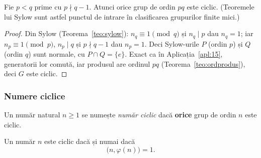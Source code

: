 \begin{propozitie}\label{prop:pqciclic}
Fie $p<q$ prime cu $p\nmid q-1$. Atunci orice grup de ordin $pq$ este ciclic. (Teoremele lui Sylow sunt astfel punctul de intrare în clasificarea grupurilor finite mici.)
\end{propozitie}

\begin{proof}
Din Sylow (Teorema~\ref{teo:sylow}): $n_q\equiv1\pmod q$ și $n_q\mid p$ dau $n_q=1$; iar $n_p\equiv1\pmod p$, $n_p\mid q$ și $p\nmid q-1$ dau $n_p=1$. Deci Sylow-urile $P$ (ordin $p$) și $Q$ (ordin $q$) sunt normale, cu $P\cap Q=\{e\}$. Exact ca în Aplicația~\ref{apl:15}, generatorii lor comută, iar produsul are ordinul $pq$ (Teorema~\ref{teo:ordprodus}), deci $G$ este ciclic.
\end{proof}


\subsubsection*{Numere ciclice}

\begin{definitie}
Un număr natural $n\ge1$ se numește \emph{număr ciclic} dacă \textbf{orice} grup de ordin $n$ este ciclic.
\end{definitie}

\begin{teorema}\label{teo:numereciclice}
Un număr $n$ este ciclic dacă și numai dacă
\[
\bigl(n,\varphi(n)\bigr)=1 .
\]
\end{teorema}

